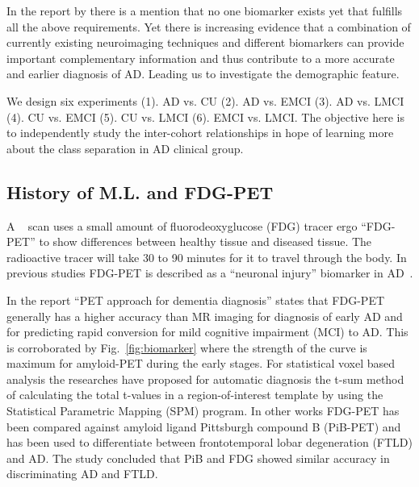 In the report by \citep*{mueller2005ways} there is a mention that no one biomarker exists yet that fulfills all the above requirements. Yet there is increasing evidence that a combination of currently existing neuroimaging techniques and different biomarkers can provide important complementary information and thus contribute to a more accurate and earlier diagnosis of AD. Leading us to investigate the demographic feature.  

We design six experiments (1). AD vs. CU (2). AD vs. EMCI (3). AD vs. LMCI (4). CU vs. EMCI (5). CU vs. LMCI (6). EMCI vs. LMCI. The objective here is to independently study the inter-cohort relationships in hope of learning more about the class separation in AD clinical group.

\subsection{History of M.L. and FDG-PET}
A \FDGPET~ scan uses a small amount of fluorodeoxyglucose (FDG) tracer ergo ``FDG-PET'' to show differences between healthy tissue and diseased tissue. The radioactive tracer will take 30 to 90 minutes for it to travel through the body. In previous studies FDG-PET is described as a
“neuronal injury” biomarker in AD~\citep{ishii2002clinical,ishii2014pet}.

In the report ``PET approach for dementia diagnosis''\cite{ishii2014pet} states that FDG-PET generally has a higher accuracy than MR imaging for diagnosis of early AD and for predicting rapid conversion for mild cognitive impairment (MCI) to AD. This is corroborated by Fig.~\ref{fig:biomarker} where the strength of the curve is maximum for amyloid-PET during the early stages. For statistical voxel based analysis the researches have proposed for automatic diagnosis the t-sum method of calculating the total t-values in a region-of-interest template by using the Statistical Parametric Mapping (SPM) program. 
In other works \citep*{rabinovici2011amyloid} FDG-PET has been compared against amyloid ligand Pittsburgh
compound B (PiB-PET) and has been used to differentiate between  frontotemporal lobar degeneration (FTLD) and AD. The study concluded that PiB and FDG showed similar accuracy in discriminating AD and FTLD. 

